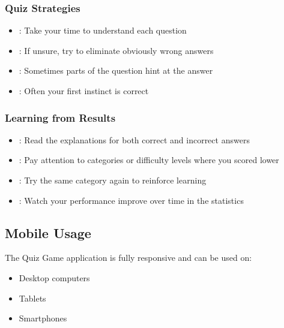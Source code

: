 \documentclass[letterpaper,10pt,english]{sphinxmanual}
\begin{document}
\subsubsection{Quiz Strategies}
\label{\detokenize{user_guide:quiz-strategies}}\begin{itemize}
\item {} 
\sphinxAtStartPar
{}: Take your time to understand each question

\item {} 
\sphinxAtStartPar
{}: If unsure, try to eliminate obviously wrong answers

\item {} 
\sphinxAtStartPar
{}: Sometimes parts of the question hint at the answer

\item {} 
\sphinxAtStartPar
{}: Often your first instinct is correct

\end{itemize}


\subsubsection{Learning from Results}
\label{\detokenize{user_guide:learning-from-results}}\begin{itemize}
\item {} 
\sphinxAtStartPar
{}: Read the explanations for both correct and incorrect answers

\item {} 
\sphinxAtStartPar
{}: Pay attention to categories or difficulty levels where you scored lower

\item {} 
\sphinxAtStartPar
{}: Try the same category again to reinforce learning

\item {} 
\sphinxAtStartPar
{}: Watch your performance improve over time in the statistics

\end{itemize}


\subsection{Mobile Usage}
\label{\detokenize{user_guide:mobile-usage}}
\sphinxAtStartPar
The Quiz Game application is fully responsive and can be used on:
\begin{itemize}
\item {} 
\sphinxAtStartPar
Desktop computers

\item {} 
\sphinxAtStartPar
Tablets

\item {} 
\sphinxAtStartPar
Smartphones

\end{itemize}
\end{document}

